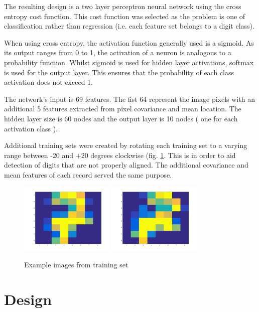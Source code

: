 \documentclass[11]{article}
\begin{document}
The resulting design is a two layer perceptron neural network using the cross entropy cost function. This cost function was selected as the problem is one of classification rather than regression (i.e. each feature set belongs to a digit class).

When using cross entropy, the activation function generally used is a sigmoid. As its output ranges from 0 to 1, the activation of a neuron is analogous to a probability function. Whilst sigmoid is used for hidden layer activations, softmax is used for the output layer. This ensures that the probability of each class activation does not exceed 1. 

The network's input is 69 features. The fist 64 represent the image pixels with an additional 5 features extracted from pixel covariance and mean location.  The hidden layer size is 60 nodes and the output layer is 10 nodes ( one for each activation class ). 

Additional training sets were created by rotating each training set to a varying range between -20 and +20 degrees clockwise (fig. \ref{fig:rotated}. This is in order to aid detection of digits that are not properly aligned. The additional covariance and mean features of each record served the same purpose. 
\begin{figure}[h]
\centering
\includegraphics[width=0.4\textwidth]{seven.png}
\includegraphics[width=0.4\textwidth]{seven_rotated.png}
\caption{Example images from training set}
\label{fig:rotated}
\end{figure}
\section{Design}
\end{document}
